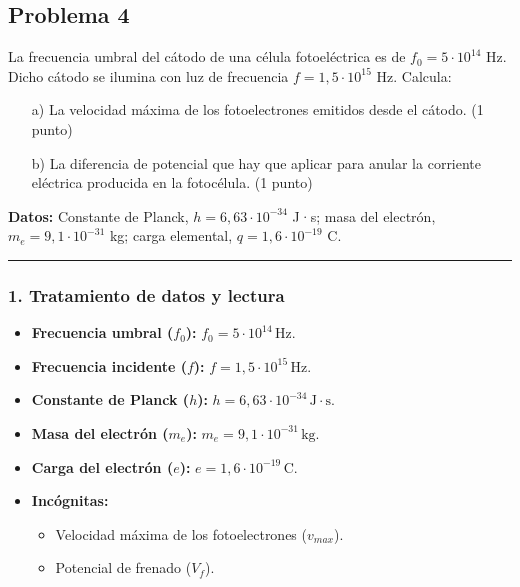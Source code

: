 \subsection{Problema 4}
\label{subsec:P4_2024_jul_ext}

\begin{cajaenunciado}
La frecuencia umbral del cátodo de una célula fotoeléctrica es de $f_{0}=5 \cdot 10^{14}$ Hz. Dicho cátodo se ilumina con luz de frecuencia $f=1,5 \cdot 10^{15}$ Hz. Calcula:
\begin{enumerate}
    \item[a)] La velocidad máxima de los fotoelectrones emitidos desde el cátodo. (1 punto)
    \item[b)] La diferencia de potencial que hay que aplicar para anular la corriente eléctrica producida en la fotocélula. (1 punto)
\end{enumerate}
\textbf{Datos:} Constante de Planck, $h=6,63 \cdot 10^{-34}$ J·s; masa del electrón, $m_e=9,1 \cdot 10^{-31}$ kg; carga elemental, $q=1,6 \cdot 10^{-19}$ C.
\end{cajaenunciado}
\hrule

\subsubsection*{1. Tratamiento de datos y lectura}
\begin{itemize}
    \item \textbf{Frecuencia umbral ($f_0$):} $f_0 = 5 \cdot 10^{14} \, \text{Hz}$.
    \item \textbf{Frecuencia incidente ($f$):} $f = 1,5 \cdot 10^{15} \, \text{Hz}$.
    \item \textbf{Constante de Planck ($h$):} $h = 6,63 \cdot 10^{-34} \, \text{J}\cdot\text{s}$.
    \item \textbf{Masa del electrón ($m_e$):} $m_e = 9,1 \cdot 10^{-31} \, \text{kg}$.
    \item \textbf{Carga del electrón ($e$):} $e = 1,6 \cdot 10^{-19} \, \text{C}$.
    \item \textbf{Incógnitas:}
    \begin{itemize}
        \item Velocidad máxima de los fotoelectrones ($v_{max}$).
        \item Potencial de frenado ($V_f$).
    \end{itemize}
\end{itemize}

